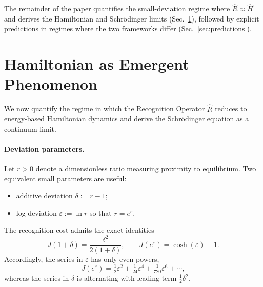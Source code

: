 \documentclass[aps,prx,twocolumn,superscriptaddress,nofootinbib]{revtex4-2}
\newcommand{\Rhat}{\hat{R}}
\newcommand{\Hhat}{\hat{H}}
\newcommand{\Jcost}{J}
\begin{document}
The remainder of the paper quantifies the small-deviation regime where \(\Rhat\approx\Hhat\) and derives the Hamiltonian and Schrödinger limits (Sec.~\ref{sec:emergence}), followed by explicit predictions in regimes where the two frameworks differ (Sec.~\ref{sec:predictions}).

\section{Hamiltonian as Emergent Phenomenon}\label{sec:emergence}
We now quantify the regime in which the Recognition Operator \(\Rhat\) reduces to energy-based Hamiltonian dynamics and derive the Schrödinger equation as a continuum limit.

\paragraph*{Deviation parameters.} Let \(r>0\) denote a dimensionless ratio measuring proximity to equilibrium. Two equivalent small parameters are useful:
\begin{itemize}
  \item additive deviation \(\delta := r-1\);
  \item log-deviation \(\varepsilon := \ln r\) so that \(r=e^{\varepsilon}\).
\end{itemize}
The recognition cost admits the exact identities
\begin{equation}\label{eq:J_exact_forms}
  \Jcost(1+\delta) = \frac{\delta^2}{2(1+\delta)},\qquad \Jcost(e^{\varepsilon})=\cosh(\varepsilon)-1.
\end{equation}
Accordingly, the series in \(\varepsilon\) has only even powers,
\begin{equation}\label{eq:J_series_log}
  \Jcost(e^{\varepsilon}) = \tfrac12\varepsilon^2 + \tfrac1{24}\varepsilon^4 + \tfrac1{720}\varepsilon^6 + \cdots,
\end{equation}
whereas the series in \(\delta\) is alternating with leading term \(\tfrac12\delta^2\).
\end{document}
